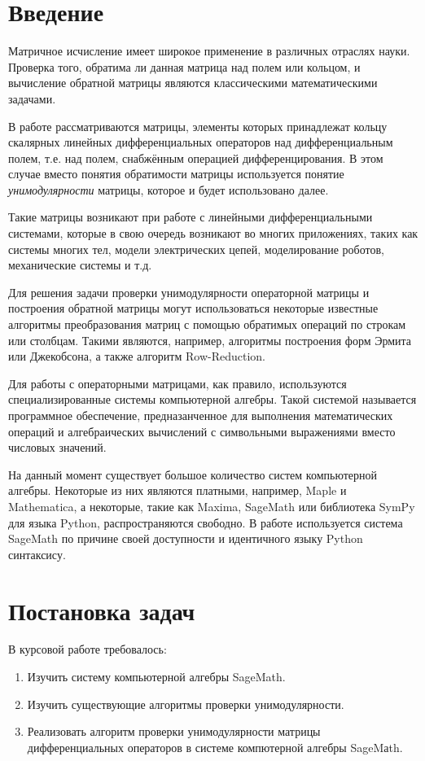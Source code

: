 \newpage
\section{Введение}
    Матричное исчисление имеет широкое применение в различных отраслях науки. Проверка того, 
    обратима ли данная матрица над полем или кольцом, и вычисление обратной матрицы
    являются классическими математическими задачами.


    В работе рассматриваются матрицы, элементы которых принадлежат 
    кольцу скалярных линейных дифференциальных операторов над
    дифференциальным полем, т.е. над полем, снабжённым операцией дифференцирования.
    В этом случае вместо понятия обратимости матрицы используется понятие 
    \emph{унимодулярности} матрицы, которое и будет использовано далее.


    Такие матрицы возникают при работе с линейными дифференциальными системами, 
    которые в свою очередь возникают во многих приложениях, таких как 
    системы многих тел, модели электрических цепей, моделирование роботов, 
    механические системы и т.д.


    Для решения задачи проверки унимодулярности операторной матрицы и построения 
    обратной матрицы могут использоваться некоторые известные алгоритмы преобразования 
    матриц с помощью обратимых операций по строкам или столбцам. Такими являются, 
    например, алгоритмы построения форм Эрмита или Джекобсона, а также алгоритм 
    Row-Reduction.  


    Для работы с операторными матрицами, как правило, используются специализированные 
    системы компьютерной алгебры. Такой системой называется программное обеспечение, 
    предназанченное для выполнения математических операций и алгебраических 
    вычислений с символьными выражениями вместо числовых значений. 

    
    На данный момент существует большое количество систем компьютерной алгебры. Некоторые из них 
    являются платными, например, Maple и Mathematica, а некоторые, такие как 
    Maxima, SageMath или библиотека SymPy для языка Python, распространяются 
    свободно. В работе используется система SageMath по причине своей доступности и 
    идентичного языку Python синтаксису.
\newpage
\section{Постановка задач}
    В курсовой работе требовалось:
    \begin{enumerate}
        \item Изучить систему компьютерной алгебры SageMath.
        \item Изучить существующие алгоритмы проверки унимодулярности.
        \item Реализовать алгоритм проверки унимодулярности матрицы 
        дифференциальных операторов в системе компютерной алгебры SageMаth.
    \end{enumerate}